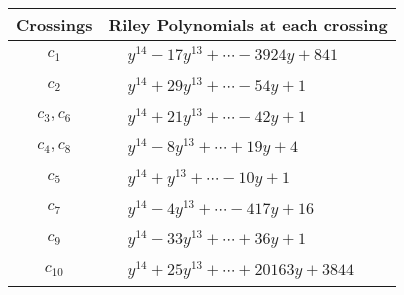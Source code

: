 \documentclass[1p]{elsarticle_modified}
\theoremstyle{definition}
\begin{document}
\begin{tabular}{m{50pt}|m{274pt}}
Crossings & \hspace{64pt}Riley Polynomials at each crossing \\
\hline $$\begin{aligned}c_{1}\end{aligned}$$&$\begin{aligned}
&y^{14}-17 y^{13}+\cdots-3924 y+841
\end{aligned}$\\
\hline $$\begin{aligned}c_{2}\end{aligned}$$&$\begin{aligned}
&y^{14}+29 y^{13}+\cdots-54 y+1
\end{aligned}$\\
\hline $$\begin{aligned}c_{3},c_{6}\end{aligned}$$&$\begin{aligned}
&y^{14}+21 y^{13}+\cdots-42 y+1
\end{aligned}$\\
\hline $$\begin{aligned}c_{4},c_{8}\end{aligned}$$&$\begin{aligned}
&y^{14}-8 y^{13}+\cdots+19 y+4
\end{aligned}$\\
\hline $$\begin{aligned}c_{5}\end{aligned}$$&$\begin{aligned}
&y^{14}+y^{13}+\cdots-10 y+1
\end{aligned}$\\
\hline $$\begin{aligned}c_{7}\end{aligned}$$&$\begin{aligned}
&y^{14}-4 y^{13}+\cdots-417 y+16
\end{aligned}$\\
\hline $$\begin{aligned}c_{9}\end{aligned}$$&$\begin{aligned}
&y^{14}-33 y^{13}+\cdots+36 y+1
\end{aligned}$\\
\hline $$\begin{aligned}c_{10}\end{aligned}$$&$\begin{aligned}
&y^{14}+25 y^{13}+\cdots+20163 y+3844
\end{aligned}$\\
\hline
\end{tabular}\\~\\
\end{document}
